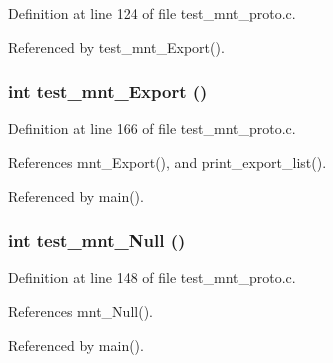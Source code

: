 Definition at line 124 of file test\_\-mnt\_\-proto.c.

Referenced by test\_\-mnt\_\-Export().
\subsubsection{\setlength{\rightskip}{0pt plus 5cm}int test\_\-mnt\_\-Export ()}\label{test__mnt__proto_8c_a4}




Definition at line 166 of file test\_\-mnt\_\-proto.c.

References mnt\_\-Export(), and print\_\-export\_\-list().

Referenced by main().
\subsubsection{\setlength{\rightskip}{0pt plus 5cm}int test\_\-mnt\_\-Null ()}\label{test__mnt__proto_8c_a3}




Definition at line 148 of file test\_\-mnt\_\-proto.c.

References mnt\_\-Null().

Referenced by main().